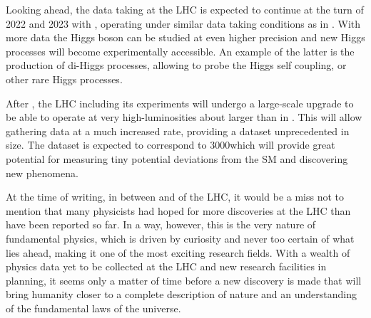 Looking ahead, the data taking at the LHC is expected to continue at the turn of 2022 and 2023 with \RunThr, operating under similar data taking conditions as in \RunTwo. 
With more data the Higgs boson can be studied at even higher precision and new Higgs processes will become experimentally accessible. An example of the latter is the production of di-Higgs processes, allowing to probe the Higgs self coupling, or other rare Higgs processes. 

After \RunThr, the LHC including its experiments will undergo a large-scale upgrade to be able to operate at very high-luminosities about  larger than in \RunTwo. 
This will allow gathering data at a much increased rate, providing a dataset unprecedented in size.
The dataset is expected to correspond to 3000\ifb which will provide great potential for measuring tiny potential deviations from the SM and discovering new phenomena.

At the time of writing, in between \RunTwo and \RunThr of the LHC, it would be a miss not to mention that many physicists had hoped for more discoveries at the LHC than have been reported so far. 
In a way, however, this is the very nature of fundamental physics, which is driven by curiosity and never too certain of what lies ahead, making it one of the most exciting research fields. 
With a wealth of physics data yet to be collected at the LHC and new research facilities in planning, it seems only a matter of time before a new discovery is made that will bring humanity closer to a complete description of nature and an understanding of the fundamental laws of the universe.



